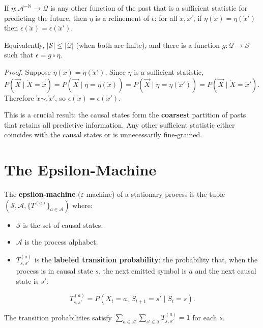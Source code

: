 \begin{proposition}
If $\eta: \mathcal{A}^{-\mathbb{N}} \to \mathcal{Q}$ is any other function of the past that is a sufficient statistic for predicting the future, then $\eta$ is a refinement of $\epsilon$: for all $\overleftarrow{x}, \overleftarrow{x}'$, if $\eta(\overleftarrow{x}) = \eta(\overleftarrow{x}')$ then $\epsilon(\overleftarrow{x}) = \epsilon(\overleftarrow{x}')$.

Equivalently, $|\mathcal{S}| \leq |\mathcal{Q}|$ (when both are finite), and there is a function $g: \mathcal{Q} \to \mathcal{S}$ such that $\epsilon = g \circ \eta$.

\textit{Proof.} Suppose $\eta(\overleftarrow{x}) = \eta(\overleftarrow{x}')$. Since $\eta$ is a sufficient statistic, $P(\overrightarrow{X} \mid \overleftarrow{X} = \overleftarrow{x}) = P(\overrightarrow{X} \mid \eta = \eta(\overleftarrow{x})) = P(\overrightarrow{X} \mid \eta = \eta(\overleftarrow{x}')) = P(\overrightarrow{X} \mid \overleftarrow{X} = \overleftarrow{x}')$. Therefore $\overleftarrow{x} \sim_\varepsilon \overleftarrow{x}'$, so $\epsilon(\overleftarrow{x}) = \epsilon(\overleftarrow{x}')$.

This is a crucial result: the causal states form the \textbf{coarsest} partition of pasts that retains all predictive information. Any other sufficient statistic either coincides with the causal states or is unnecessarily fine-grained.
\end{proposition}

\section{The Epsilon-Machine}

\begin{definition}
The \textbf{epsilon-machine} ($\varepsilon$-machine) of a stationary process is the tuple $(\mathcal{S}, \mathcal{A}, \{ T^{(a)}\} _{a \in \mathcal{A}})$ where:

\begin{itemize}
\item $\mathcal{S}$ is the set of causal states.
\item $\mathcal{A}$ is the process alphabet.
\item $T^{(a)}_{s,s'}$ is the \textbf{labeled transition probability}: the probability that, when the process is in causal state $s$, the next emitted symbol is $a$ and the next causal state is $s'$:

\end{itemize}
\[T^{(a)}_{s,s'} = P(X_t = a, \, S_{t+1} = s' \mid S_t = s).\]

The transition probabilities satisfy $\sum_{a \in \mathcal{A}} \sum_{s' \in \mathcal{S}} T^{(a)}_{s,s'} = 1$ for each $s$.
\end{definition}

